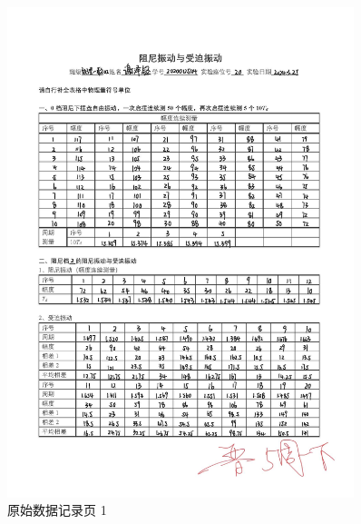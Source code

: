 \documentclass[12pt,a4paper]{amsart}
\begin{document}
\begin{figure}[h]
	\centering
	\includegraphics[width=0.9\textwidth]{img/original_data_page_1.jpg}
	\caption{原始数据记录页 1}
	\label{fig:original_data_page_1}
\end{figure}
\end{document}
